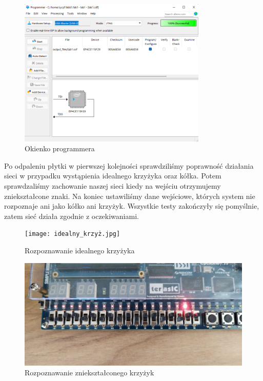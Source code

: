 \documentclass[a4paper, titleauthor]{mwart}
\begin{document}
\begin{figure}[h!]
    \centering
    \includegraphics[width = 0.8\textwidth]{programmer.png}
    \caption{Okienko programmera}
    \label{fig:enter-label}
\end{figure}
Po odpaleniu płytki w pierwszej kolejności sprawdziliśmy poprawność działania sieci w przypadku wystąpienia idealnego krzyżyka oraz kółka. Potem sprawdzaliśmy zachowanie naszej sieci kiedy na wejściu otrzymujemy zniekształcone znaki. Na koniec ustawiliśmy dane wejściowe, których system nie rozpoznaje  ani jako kółko ani krzyżyk. Wszystkie testy zakończyły się pomyślnie, zatem sieć działa zgodnie z oczekiwaniami.
\begin{figure}[h!]
    \centering
    \texttt{[image: idealny\_krzyż.jpg]}
    \caption{Rozpoznawanie idealnego krzyżyka}
    \label{fig:enter-label}
\end{figure}
\begin{figure}[h!]
    \centering
    \includegraphics[width = \textwidth, height = 0.6\textwidth]{zniekształcony_krzyż.jpg}
    \caption{Rozpoznawanie zniekształconego krzyżyk}
    \label{fig:enter-label}
\end{figure}
\end{document}
